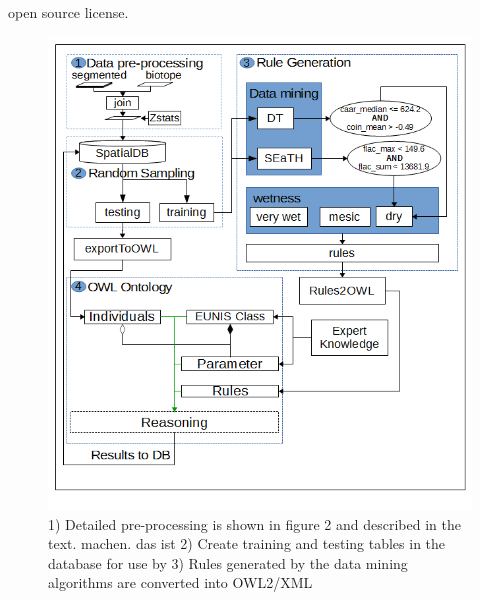 \documentclass[authoryear, review,12pt,number]{elsarticle}
\begin{document}
open source license.  \begin{figure}
    \includegraphics[width=1\linewidth]{diagrams/another_workflow_diagram_large.png}
    \caption{1) Detailed pre-processing is shown in figure 2 and described in
        the text.%
        machen. das ist
    2) Create training and testing tables in the database for use by 3)  Rules
generated by the data mining algorithms are converted into OWL2/XML }
\label{fig_full_workflow} \end{figure}
\end{document}
